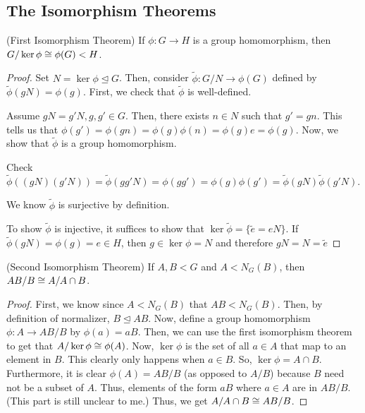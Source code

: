 \documentclass[11pt,leqno,oneside]{amsart}
\newcommand{\subgroup}{\mathrel{<}}
\newcommand{\normsubgroup}{\mathrel{\unlhd}}
\begin{document}
\subsection*{The Isomorphism Theorems}
\begin{thm}
    (First Isomorphism Theorem) If $\phi: G \to H$ is a group homomorphism, then $G/\ker \phi \isom \phi(G) \subgroup H$.
\end{thm}
\begin{proof}
    Set $N = \ker \phi \normsubgroup G$. Then, consider $\widetilde{\phi}: G/N
    \to \phi(G)$ defined by $\widetilde{\phi}(gN) = \phi(g)$. First, we check
    that $\widetilde{\phi}$ is well-defined.

    Assume $gN = g'N, g,g' \in G$. Then, there exists $n \in N$ such that $g'
    = gn$. This tells us that $\phi(g') = \phi(gn) = \phi(g)\phi(n) = \phi(g)e
    = \phi(g)$. Now, we show that $\widetilde{\phi}$ is a group homomorphism.

    Check $\widetilde{\phi}( (gN)(g'N) ) = \widetilde{\phi}(gg'N) = \phi(gg') =
    \phi(g)\phi(g') = \widetilde{\phi}(gN) \widetilde{\phi}(g'N)$.

    We know $\widetilde{\phi}$ is surjective by definition.

    To show $\widetilde{\phi}$ is injective, it suffices to show that $\ker
    \widetilde{\phi} = \{\widetilde{e} = eN\}$. If $\widetilde{\phi}(gN) =
    \phi(g) = e \in H$, then $g \in \ker \phi = N$ and therefore $gN = N =
    \widetilde{e}$
\end{proof}
\begin{cor}
    (Second Isomorphism Theorem) If $A,B \subgroup G$ and $A \subgroup N_G(B)$,
    then $AB/B \mathrel{\cong} A/A\cap B$.
\end{cor}
\begin{proof}
    First, we know since $A \subgroup N_G(B)$ that $AB \subgroup N_G(B)$. Then,
    by definition of normalizer, $B \normsubgroup AB$. Now, define a group
    homomorphism $\phi: A \to AB/B$ by $\phi(a) = aB$. Then, we can use the
    first isomorphism theorem to get that $A/\ker \phi \mathrel{\cong} \phi(A)$. Now,
    $\ker \phi$ is the set of all $a \in A$ that map to an element in $B$. This
    clearly only happens when $a \in B$. So, $\ker \phi = A \cap B$.
    Furthermore, it is clear $\phi(A) = AB/B$ (as opposed to $A/B$) because $B$
    need not be a subset of $A$. Thus, elements of the form $aB$ where $a \in A$
    are in $AB/B$. (This part is still unclear to me.) Thus, we get $A/A \cap B
    \mathrel{\cong} AB/B$.
\end{proof}
\end{document}

